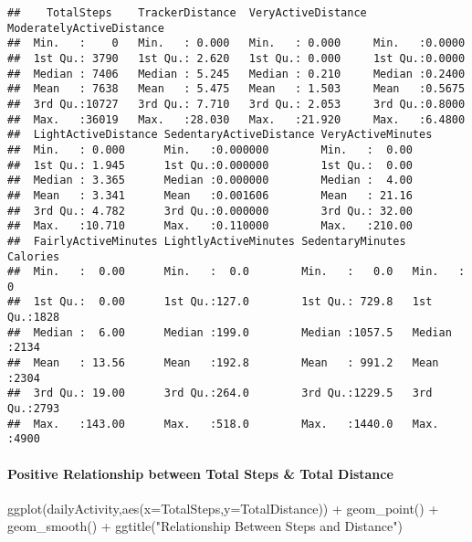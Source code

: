 \documentclass[
]{article}
\newenvironment{Shaded}{\begin{snugshade}}{\end{snugshade}}
\newcommand{\AttributeTok}[1]{\textcolor[rgb]{0.77,0.63,0.00}{#1}}
\newcommand{\FunctionTok}[1]{\textcolor[rgb]{0.00,0.00,0.00}{#1}}
\newcommand{\NormalTok}[1]{#1}
\newcommand{\SpecialCharTok}[1]{\textcolor[rgb]{0.00,0.00,0.00}{#1}}
\newcommand{\StringTok}[1]{\textcolor[rgb]{0.31,0.60,0.02}{#1}}
\begin{document}
\begin{verbatim}
##    TotalSteps    TrackerDistance  VeryActiveDistance ModeratelyActiveDistance
##  Min.   :    0   Min.   : 0.000   Min.   : 0.000     Min.   :0.0000          
##  1st Qu.: 3790   1st Qu.: 2.620   1st Qu.: 0.000     1st Qu.:0.0000          
##  Median : 7406   Median : 5.245   Median : 0.210     Median :0.2400          
##  Mean   : 7638   Mean   : 5.475   Mean   : 1.503     Mean   :0.5675          
##  3rd Qu.:10727   3rd Qu.: 7.710   3rd Qu.: 2.053     3rd Qu.:0.8000          
##  Max.   :36019   Max.   :28.030   Max.   :21.920     Max.   :6.4800          
##  LightActiveDistance SedentaryActiveDistance VeryActiveMinutes
##  Min.   : 0.000      Min.   :0.000000        Min.   :  0.00   
##  1st Qu.: 1.945      1st Qu.:0.000000        1st Qu.:  0.00   
##  Median : 3.365      Median :0.000000        Median :  4.00   
##  Mean   : 3.341      Mean   :0.001606        Mean   : 21.16   
##  3rd Qu.: 4.782      3rd Qu.:0.000000        3rd Qu.: 32.00   
##  Max.   :10.710      Max.   :0.110000        Max.   :210.00   
##  FairlyActiveMinutes LightlyActiveMinutes SedentaryMinutes    Calories   
##  Min.   :  0.00      Min.   :  0.0        Min.   :   0.0   Min.   :   0  
##  1st Qu.:  0.00      1st Qu.:127.0        1st Qu.: 729.8   1st Qu.:1828  
##  Median :  6.00      Median :199.0        Median :1057.5   Median :2134  
##  Mean   : 13.56      Mean   :192.8        Mean   : 991.2   Mean   :2304  
##  3rd Qu.: 19.00      3rd Qu.:264.0        3rd Qu.:1229.5   3rd Qu.:2793  
##  Max.   :143.00      Max.   :518.0        Max.   :1440.0   Max.   :4900
\end{verbatim}

\hypertarget{positive-relationship-between-total-steps-total-distance}{%
\paragraph{Positive Relationship between Total Steps \& Total
Distance}\label{positive-relationship-between-total-steps-total-distance}}

\begin{Shaded}
\begin{Highlighting}[]
\FunctionTok{ggplot}\NormalTok{(dailyActivity,}\FunctionTok{aes}\NormalTok{(}\AttributeTok{x=}\NormalTok{TotalSteps,}\AttributeTok{y=}\NormalTok{TotalDistance)) }\SpecialCharTok{+} \FunctionTok{geom\_point}\NormalTok{() }\SpecialCharTok{+} \FunctionTok{geom\_smooth}\NormalTok{() }\SpecialCharTok{+}
  \FunctionTok{ggtitle}\NormalTok{(}\StringTok{"Relationship Between Steps and Distance"}\NormalTok{)}
\end{Highlighting}
\end{Shaded}
\end{document}
